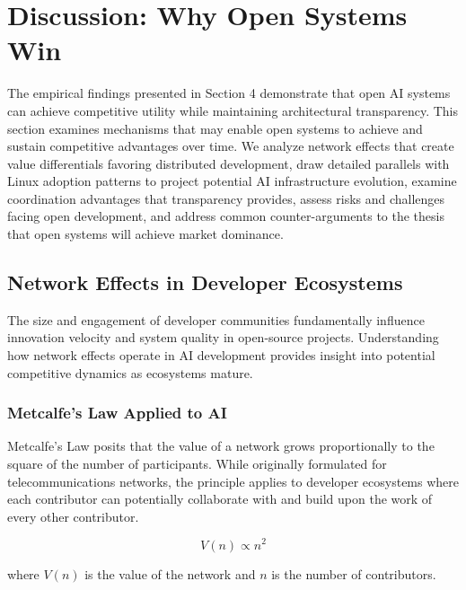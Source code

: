 
\section{Discussion: Why Open Systems Win}

The empirical findings presented in Section 4 demonstrate that open AI systems can achieve competitive utility while maintaining architectural transparency. This section examines mechanisms that may enable open systems to achieve and sustain competitive advantages over time. We analyze network effects that create value differentials favoring distributed development, draw detailed parallels with Linux adoption patterns to project potential AI infrastructure evolution, examine coordination advantages that transparency provides, assess risks and challenges facing open development, and address common counter-arguments to the thesis that open systems will achieve market dominance.

\subsection{Network Effects in Developer Ecosystems}

The size and engagement of developer communities fundamentally influence innovation velocity and system quality in open-source projects. Understanding how network effects operate in AI development provides insight into potential competitive dynamics as ecosystems mature.





\subsubsection{Metcalfe's Law Applied to AI}

Metcalfe's Law posits that the value of a network grows proportionally to the square of the number of participants. While originally formulated for telecommunications networks, the principle applies to developer ecosystems where each contributor can potentially collaborate with and build upon the work of every other contributor.

\begin{equation}
V(n) \propto n^2
\label{eq:metcalfe}
\end{equation}

where $V(n)$ is the value of the network and $n$ is the number of contributors.

